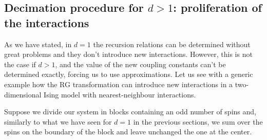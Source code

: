 \documentclass[../main/main.tex]{subfiles}
\begin{document}
\subsection{Decimation procedure for \( d>1 \): proliferation of the interactions}
As we have stated, in \( d=1 \) the recursion relations can be determined without great problems and they don't introduce new interactions. However, this is not the case if \( d>1 \), and the value of the new coupling constants can't be determined exactly, forcing us to use approximations. Let us see with a generic example how the RG transformation can introduce new interactions in a two-dimensional Ising model with nearest-neighbour interactions.

Suppose we divide our system in blocks containing an odd number of spins and, similarly to what we have seen for \( d=1 \) in the previous sections, we sum over the spins on the boundary of the block and leave unchanged the one at the center.
\end{document}
